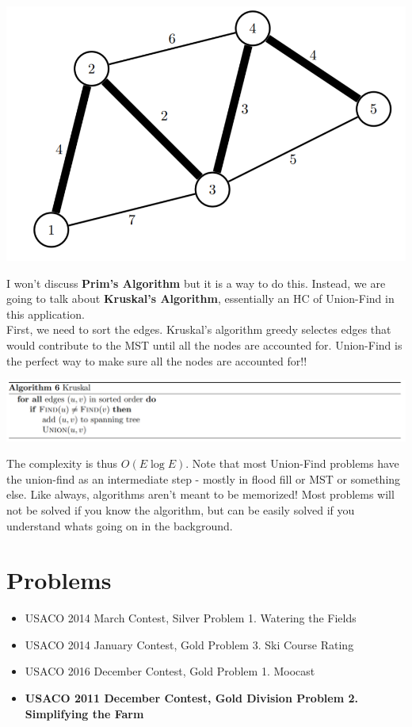 \documentclass[11pt]{article}
\begin{document}
    \begin{center}
    \includegraphics[]{images/MST.png}
    \end{center}
    
    I won't discuss \textbf{Prim's Algorithm} but it is a way to do this. Instead, we are going to talk about \textbf{Kruskal's Algorithm}, essentially an HC of Union-Find in this application. \\
    
    First, we need to sort the edges. Kruskal's algorithm greedy selectes edges that would contribute to the MST until all the nodes are accounted for. Union-Find is the perfect way to make sure all the nodes are accounted for!!
    
    \includegraphics[]{images/Kruskal.png}
    
    The complexity is thus $O(E\log E)$. Note that most Union-Find problems have the union-find as an intermediate step - mostly in flood fill or MST or something else. Like always, algorithms aren't meant to be memorized! Most problems will not be solved if you know the algorithm, but can be easily solved if you understand whats going on in the background. 
    
\section{Problems}
\begin{itemize}
    \item USACO 2014 March Contest, Silver Problem 1. Watering the Fields
    \item USACO 2014 January Contest, Gold Problem 3. Ski Course Rating
    \item USACO 2016 December Contest, Gold Problem 1. Moocast
    \item \textbf{USACO 2011 December Contest, Gold Division Problem 2. Simplifying the Farm}
\end{itemize}
\end{document}
